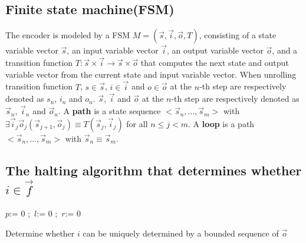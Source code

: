 \documentclass[conference]{IEEEtran}
\begin{document}
\subsection{Finite state machine(FSM)}\label{subsec_fsm}



The encoder is modeled by a FSM $M=(\vec{s},\vec{i},\vec{o},T)$,
consisting of a state variable vector $\vec{s}$,
an input variable vector $\vec{i}$,
an output variable vector $\vec{o}$,
and a transition function $T: \vec{s}\times \vec{i}\to \vec{s}\times \vec{o}$ 
that computes the next state and output variable vector from the current state and input variable vector.
When unrolling transition function $T$,
$s\in\vec{s}$,  $i\in\vec{i}$ and  $o\in\vec{o}$ at the $n$-th step 
are respectively denoted as $s_n$, $i_n$ and $o_n$.
$\vec{s}$, $\vec{i}$ and $\vec{o}$ at the $n$-th step are respectively denoted as $\vec{s}_n$, $\vec{i}_n$ and $\vec{o}_n$.
A \textbf{path} is a state sequence $<\vec{s}_n,\dots,\vec{s}_m>$ with $\exists \vec{i}_j\vec{o}_j (\vec{s}_{j+1},\vec{o}_j)\equiv T(\vec{s}_j,\vec{i}_j)$ for all $n\le j< m$.
A \textbf{loop} is a path $<\vec{s}_n,\dots,\vec{s}_m>$ with $\vec{s}_n\equiv \vec{s}_m$.



\subsection{The halting algorithm that determines whether $i\in\vec{f}$}\label{subsec_chkextdec}

\begin{algorithm}[t]
\SetAlgoVlined
{}
$p$:= 0 ;~$l$:= 0 ;~$r$:= 0 \;
\caption{Determine whether $i$ can be uniquely determined by a bounded sequence of $\vec{o}$}
\label{alg_fofc}
\end{algorithm}
\end{document}
